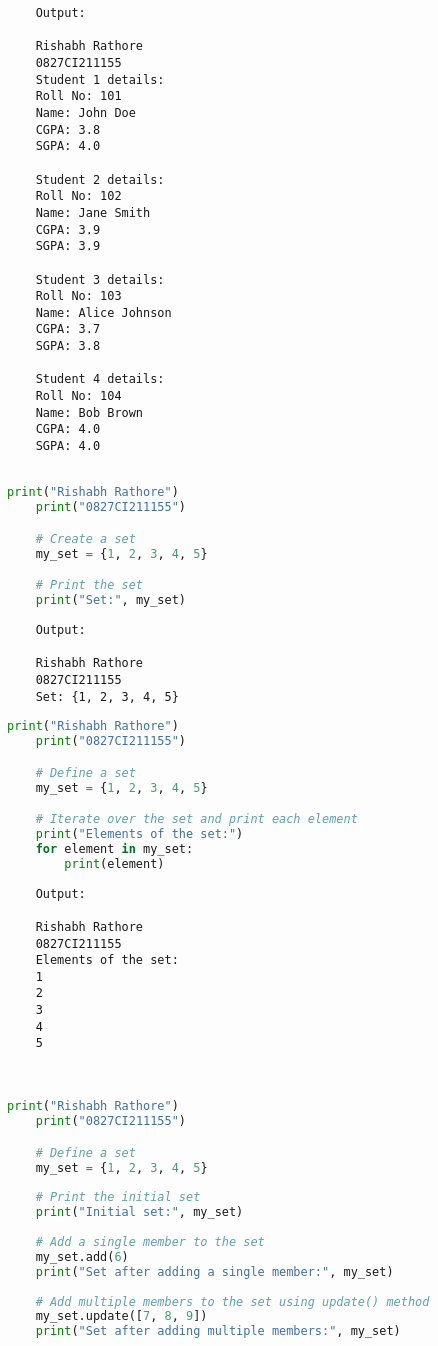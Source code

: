 \documentclass{report}
\begin{document}
\begin{verbatim}
	Output:

	Rishabh Rathore
	0827CI211155
	Student 1 details:
	Roll No: 101
	Name: John Doe
	CGPA: 3.8
	SGPA: 4.0

	Student 2 details:
	Roll No: 102
	Name: Jane Smith
	CGPA: 3.9
	SGPA: 3.9

	Student 3 details:
	Roll No: 103
	Name: Alice Johnson
	CGPA: 3.7
	SGPA: 3.8

	Student 4 details:
	Roll No: 104
	Name: Bob Brown
	CGPA: 4.0
	SGPA: 4.0


\end{verbatim}



\bigskip

\sol 
\begin{lstlisting}[language=Python]
	print("Rishabh Rathore")
	print("0827CI211155")

	# Create a set
	my_set = {1, 2, 3, 4, 5}

	# Print the set
	print("Set:", my_set)
\end{lstlisting}

\begin{verbatim}
	Output:

	Rishabh Rathore
	0827CI211155
	Set: {1, 2, 3, 4, 5}

\end{verbatim}


\bigskip


\sol 
\begin{lstlisting}[language=Python]
	print("Rishabh Rathore")
	print("0827CI211155")

	# Define a set
	my_set = {1, 2, 3, 4, 5}

	# Iterate over the set and print each element
	print("Elements of the set:")
	for element in my_set:
		print(element)
\end{lstlisting}

\begin{verbatim}
	Output:

	Rishabh Rathore
	0827CI211155
	Elements of the set:
	1
	2
	3
	4
	5
	
	
\end{verbatim}


\bigskip


\sol 
\begin{lstlisting}[language=Python]
	print("Rishabh Rathore")
	print("0827CI211155")

	# Define a set
	my_set = {1, 2, 3, 4, 5}
	
	# Print the initial set
	print("Initial set:", my_set)
	
	# Add a single member to the set
	my_set.add(6)
	print("Set after adding a single member:", my_set)
	
	# Add multiple members to the set using update() method
	my_set.update([7, 8, 9])
	print("Set after adding multiple members:", my_set)
\end{lstlisting}
\end{document}
